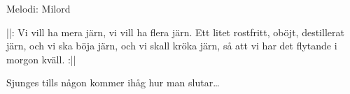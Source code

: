 \begin{song}

\begin{songmeta}
Melodi: Milord
\end{songmeta}

\begin{songtext}
||: Vi vill ha mera järn,
vi vill ha flera järn.
Ett litet rostfritt, oböjt,
destillerat järn,
och vi ska böja järn,
och vi skall kröka järn,
så att vi har det flytande
i morgon kväll. :||
\end{songtext}

\begin{songnotes}
Sjunges tills någon kommer ihåg hur man slutar\ldots
\end{songnotes}
\end{song}
